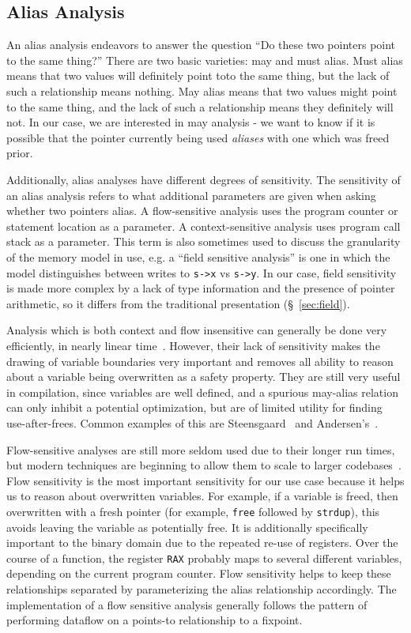 \subsection{Alias Analysis}
An alias analysis endeavors to answer the question ``Do these two pointers point to the same thing?''
There are two basic varieties: may and must alias.
Must alias means that two values will definitely point toto the same thing, but the lack of such a relationship means nothing.
May alias means that two values might point to the same thing, and the lack of such a relationship means they definitely will not.
In our case, we are interested in may analysis - we want to know if it is possible that the pointer currently being used \emph{aliases} with one which was freed prior.

Additionally, alias analyses have different degrees of sensitivity.
The sensitivity of an alias analysis refers to what additional parameters are given when asking whether two pointers alias.
A flow-sensitive analysis uses the program counter or statement location as a parameter.
A context-sensitive analysis uses program call stack as a parameter.
This term is also sometimes used to discuss the granularity of the memory model in use, e.g. a ``field sensitive analysis'' is one in which the model distinguishes between writes to \texttt{s->x} vs \texttt{s->y}.
In our case, field sensitivity is made more complex by a lack of type information and the presence of pointer arithmetic, so it differs from the traditional presentation (\S~\ref{sec:field}).

Analysis which is both context and flow insensitive can generally be done very efficiently, in nearly linear time~\cite{steensgaard-alias}.
However, their lack of sensitivity makes the drawing of variable boundaries very important and removes all ability to reason about a variable being overwritten as a safety property.
They are still very useful in compilation, since variables are well defined, and a spurious may-alias relation can only inhibit a potential optimization, but are of limited utility for finding use-after-frees.
Common examples of this are Steensgaard~\cite{steensgaard-alias} and Andersen's~\cite{andersen-alias}.

Flow-sensitive analyses are still more seldom used due to their longer run times, but modern techniques are beginning to allow them to scale to larger codebases~\cite{sfs}.
Flow sensitivity is the most important sensitivity for our use case because it helps us to reason about overwritten variables.
For example, if a variable is freed, then overwritten with a fresh pointer (for example, \texttt{free} followed by \texttt{strdup}), this avoids leaving the variable as potentially free.
It is additionally specifically important to the binary domain due to the repeated re-use of registers.
Over the course of a function, the register \texttt{RAX} probably maps to several different variables, depending on the current program counter.
Flow sensitivity helps to keep these relationships separated by parameterizing the alias relationship accordingly.
The implementation of a flow sensitive analysis generally follows the pattern of performing dataflow on a points-to relationship to a fixpoint.

